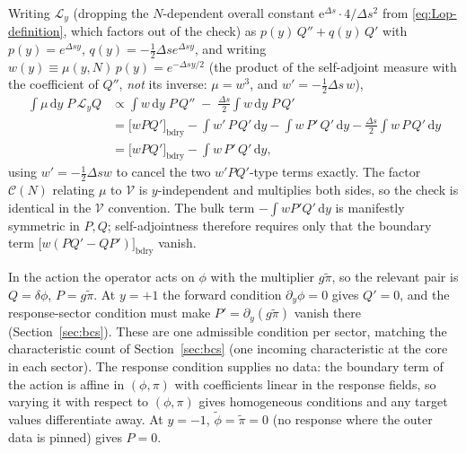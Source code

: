 \documentclass[a4paper,11pt]{article}
\newcommand{\semibold}[1]{{\fontseries{b}\selectfont{#1}}}
\renewcommand{\d}{\mathrm{d}}
\newcommand{\e}[1]{\mathrm{e}^{{#1}}}
\newenvironment{panel}{\begin{tcolorbox}[enhanced,breakable,colback=gray!10,colframe=gray!30]\small}{\end{tcolorbox}}
\newcommand{\Ny}{N}                          %
\newcommand{\field}{\phi}                    %
\newcommand{\mom}{\pi}                       %
\newcommand{\rfield}{\widetilde\field}       %
\newcommand{\rmom}{\widetilde\mom}           %
\newcommand{\yco}{y}                         %
\newcommand{\Deltas}{\Delta s}                %
\newcommand{\measure}{\mu}                   %
\newcommand{\weightfn}{w}                    %
\newcommand{\Lop}{\mathcal{L}_\yco}          %
\newcommand{\volel}{\mathcal{V}}             %
\newcommand{\Cpref}{\mathcal{C}}             %
\newcommand{\gpref}{g}                        %
\begin{document}
\begin{panel}
\semibold{Check of self-adjointness, with the drift term.} Writing $\Lop$
(dropping the $\Ny$-dependent overall constant $\e{\Deltas}\cdot4/\Deltas^2$
from \eqref{eq:Lop-definition}, which factors out of the check) as
$p(\yco)\,Q''+q(\yco)\,Q'$ with $p(\yco)=e^{\Deltas\yco}$,
$q(\yco)=-\tfrac12\Deltas e^{\Deltas\yco}$, and writing
$\weightfn(\yco)\equiv \measure(\yco,\Ny)\,p(\yco) = e^{-\Deltas\yco/2}$
(the product of the self-adjoint measure with the coefficient of $Q''$,
\emph{not} its inverse: $\measure=\weightfn^3$, and $\weightfn'=-\tfrac12\Deltas\,\weightfn$),
\begin{align*}
    \int \measure\,\d\yco\; P\,\Lop Q
    & \propto
    \int \weightfn\,\d\yco\;P\,Q'' \;-\; \frac{\Deltas}{2}\int\weightfn\,\d\yco\;P\,Q'
    \\
    & =
    \Big[\weightfn P Q'\Big]_{\mathrm{bdry}} - \int \weightfn'\,P\,Q'\,\d\yco - \int\weightfn\,P'\,Q'\,\d\yco - \frac{\Deltas}{2}\int\weightfn\,P\,Q'\,\d\yco
    \\
    & =
    \Big[\weightfn P Q'\Big]_{\mathrm{bdry}} - \int \weightfn\, P'\,Q'\,\d\yco ,
\end{align*}
using $\weightfn'=-\tfrac12\Deltas\weightfn$ to cancel the two
$\weightfn'PQ'$-type terms exactly. The factor $\Cpref(\Ny)$ relating
$\measure$ to $\volel$ is $\yco$-independent and multiplies both sides, so
the check is identical in the $\volel$ convention. The bulk term
$-\int\weightfn P'Q'\,\d\yco$ is manifestly symmetric in $P,Q$;
self-adjointness therefore requires only that the boundary term
$\big[\weightfn(PQ'-QP')\big]_{\mathrm{bdry}}$ vanish.

In the action the operator acts on $\field$ with the multiplier
$\gpref\rmom$, so the relevant pair is $Q=\delta\field$, $P=\gpref\rmom$.
At $\yco=+1$ the forward condition $\partial_\yco\field=0$ gives $Q'=0$,
and the response-sector condition must make $P'=\partial_\yco(\gpref\rmom)$
vanish there (Section~\ref{sec:bcs}). These are one admissible condition
per sector, matching the characteristic count of Section~\ref{sec:bcs}
(one incoming characteristic at the core in each sector). The response
condition supplies no data: the boundary term of the action is affine in
$(\field,\mom)$ with coefficients linear in the response fields, so
varying it with respect to $(\field,\mom)$ gives homogeneous conditions
and any target values differentiate away. At $\yco=-1$,
$\rfield=\rmom=0$ (no response where the outer data is pinned) gives $P=0$.
\end{panel}
\end{document}
